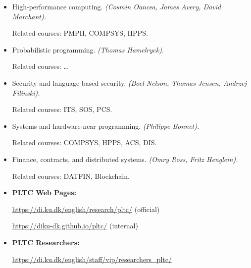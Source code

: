 \documentclass[rgb,dvipsnames,aspectratio=169]{beamer}
\begin{document}
\begin{frame}[fragile]


  \vfill

  \begin{itemize}

  \item High-performance computing.
    \emph{(Cosmin Oancea, James Avery, David Marchant).}

    Related courses: PMPH, COMPSYS, HPPS.

  \item Probabilistic programming.
    \emph{(Thomas Hamelryck).}

    Related courses: …

  \item Security and language-based security.
    \emph{(Boel Nelson, Thomas Jensen, Andrzej Filinski).}

    Related courses: ITS, SOS, PCS.

  \item Systems and hardware-near programming.
    \emph{(Philippe Bonnet).}

    Related courses: COMPSYS, HPPS, ACS, DIS.

  \item Finance, contracts, and distributed systems.
    \emph{(Omry Ross, Fritz Henglein).}

    Related courses: DATFIN, Blockchain.
  \end{itemize}

\end{frame}

\begin{frame}[fragile]


  \vfill
  \begin{itemize}
  \item \textbf{PLTC Web Pages:}

    \url{https://di.ku.dk/english/research/pltc/} (official)

    \url{https://diku-dk.github.io/pltc/} (internal)

    \vfill

  \item \textbf{PLTC Researchers:}

    \url{https://di.ku.dk/english/staff/vip/researchers_pltc/}

  \end{itemize}

\end{frame}
\end{document}
